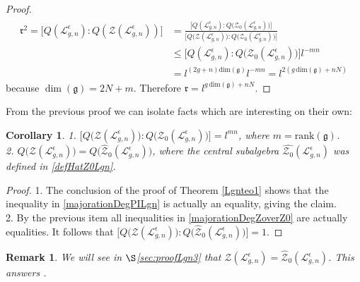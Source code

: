 \documentclass[11pt]{amsart}
\newtheorem{cor}[teo]{Corollary}
\newtheorem{remark}[teo]{Remark}
\newcommand{\e}{\epsilon}
\newcommand{\Ll}{\mathcal{L}}
\begin{document}
\begin{proof}
\begin{align}
\begin{split}\label{majorationDegPILgn}
\mathfrak{r}^2 = \bigl[Q(\Ll_{g,n}^{\e}):Q(\mathcal{Z}(\Ll_{g,n}^{\e}))\bigr] & = \frac{\bigl[Q(\Ll_{g,n}^{\e}):Q\bigl(\mathcal{Z}_0(\Ll_{g,n}^{\e})\bigr)\bigr]}{\bigl[Q\bigl(\mathcal{Z}(\Ll_{g,n}^{\e})\bigr):Q\bigl(\mathcal{Z}_0(\Ll_{g,n}^{\e})\bigr)\bigr]}\\
&\leq \bigl[Q(\Ll_{g,n}^{\e}):Q\bigl(\mathcal{Z}_0(\Ll_{g,n}^{\e})\bigr)\bigr]l^{-mn}\\
&= l^{(2g+n)\mathrm{dim}(\mathfrak{g})} l^{-mn} = l^{2(g\,\mathrm{dim}(\mathfrak{g}) + nN)}
\end{split}
\end{align}
because $\dim(\mathfrak{g}) = 2N + m$. Therefore $\mathfrak{r}= l^{g\,\mathrm{dim}(\mathfrak{g})+nN}$.
\end{proof}

From the previous proof we can isolate facts which are interesting on their own:

\begin{cor}\label{coroIsolateFacts}
1. $\bigl[ Q\bigl(\mathcal{Z}(\Ll_{g,n}^{\e})\bigr):Q\bigl(\mathcal{Z}_0(\Ll_{g,n}^{\e})\bigr) \bigr] = l^{mn}$, where $m = \mathrm{rank}(\mathfrak{g})$.
\\2. $Q\bigl( \mathcal{Z}(\mathcal{L}_{g,n}^\e) \bigr) = Q\bigl( \hat{\mathcal{Z}}_0(\mathcal{L}_{g,n}^\e) \bigr)$, where the central subalgebra $\hat{\mathcal{Z}_0}(\mathcal{L}_{g,n}^\e)$ was defined in \eqref{defHatZ0Lgn}.
\end{cor}
\begin{proof}
1. The conclusion of the proof of Theorem \ref{Lgnteo1}  shows that the inequality in \eqref{majorationDegPILgn} is actually an equality, giving the claim.
\\2. By the previous item all inequalities in \eqref{majorationDegZoverZ0} are actually equalities. It follows that $\bigl[ Q\bigl(\mathcal{Z}(\mathcal{L}_{g,n}^\e)\bigr) : Q\bigl(\hat{\mathcal{Z}}_0(\mathcal{L}_{g,n}^\e)\bigr) \bigr] = 1$.
\end{proof}

\begin{remark}{\rm We will see in $\S$\ref{sec:proofLgn3} that $\mathcal{Z}(\mathcal{L}_{g,n}^\e) = \hat{\mathcal{Z}}_0(\mathcal{L}_{g,n}^\e)$. This answers \cite[Rk\,. 5.3]{BR2}. }
\end{remark}
\end{document}
